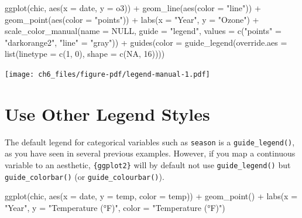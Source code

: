 \documentclass[
  letterpaper,
]{scrbook}
\newenvironment{Shaded}{\begin{snugshade}}{\end{snugshade}}
\newcommand{\AttributeTok}[1]{\textcolor[rgb]{0.40,0.45,0.13}{#1}}
\newcommand{\ConstantTok}[1]{\textcolor[rgb]{0.56,0.35,0.01}{#1}}
\newcommand{\DecValTok}[1]{\textcolor[rgb]{0.68,0.00,0.00}{#1}}
\newcommand{\FunctionTok}[1]{\textcolor[rgb]{0.28,0.35,0.67}{#1}}
\newcommand{\NormalTok}[1]{\textcolor[rgb]{0.00,0.23,0.31}{#1}}
\newcommand{\OtherTok}[1]{\textcolor[rgb]{0.00,0.23,0.31}{#1}}
\newcommand{\SpecialCharTok}[1]{\textcolor[rgb]{0.37,0.37,0.37}{#1}}
\newcommand{\StringTok}[1]{\textcolor[rgb]{0.13,0.47,0.30}{#1}}
\begin{document}
\begin{Shaded}
\begin{Highlighting}[]
\FunctionTok{ggplot}\NormalTok{(chic, }\FunctionTok{aes}\NormalTok{(}\AttributeTok{x =}\NormalTok{ date, }\AttributeTok{y =}\NormalTok{ o3)) }\SpecialCharTok{+}
  \FunctionTok{geom\_line}\NormalTok{(}\FunctionTok{aes}\NormalTok{(}\AttributeTok{color =} \StringTok{"line"}\NormalTok{)) }\SpecialCharTok{+}
  \FunctionTok{geom\_point}\NormalTok{(}\FunctionTok{aes}\NormalTok{(}\AttributeTok{color =} \StringTok{"points"}\NormalTok{)) }\SpecialCharTok{+}
  \FunctionTok{labs}\NormalTok{(}\AttributeTok{x =} \StringTok{"Year"}\NormalTok{, }\AttributeTok{y =} \StringTok{"Ozone"}\NormalTok{) }\SpecialCharTok{+}
  \FunctionTok{scale\_color\_manual}\NormalTok{(}\AttributeTok{name =} \ConstantTok{NULL}\NormalTok{,}
                     \AttributeTok{guide =} \StringTok{"legend"}\NormalTok{,}
                     \AttributeTok{values =} \FunctionTok{c}\NormalTok{(}\StringTok{"points"} \OtherTok{=} \StringTok{"darkorange2"}\NormalTok{,}
                                \StringTok{"line"} \OtherTok{=} \StringTok{"gray"}\NormalTok{)) }\SpecialCharTok{+}
  \FunctionTok{guides}\NormalTok{(}\AttributeTok{color =} \FunctionTok{guide\_legend}\NormalTok{(}\AttributeTok{override.aes =} \FunctionTok{list}\NormalTok{(}\AttributeTok{linetype =} \FunctionTok{c}\NormalTok{(}\DecValTok{1}\NormalTok{, }\DecValTok{0}\NormalTok{),}
                                                  \AttributeTok{shape =} \FunctionTok{c}\NormalTok{(}\ConstantTok{NA}\NormalTok{, }\DecValTok{16}\NormalTok{))))}
\end{Highlighting}
\end{Shaded}

\texttt{[image: ch6\_files/figure-pdf/legend-manual-1.pdf]}

\section{Use Other Legend Styles}\label{use-other-legend-styles}

The default legend for categorical variables such as \texttt{season} is
a \texttt{guide\_legend()}, as you have seen in several previous
examples. However, if you map a continuous variable to an aesthetic,
\texttt{\{ggplot2\}} will by default not use \texttt{guide\_legend()}
but \texttt{guide\_colorbar()} (or \texttt{guide\_colourbar()}).

\begin{Shaded}
\begin{Highlighting}[]
\FunctionTok{ggplot}\NormalTok{(chic,}
       \FunctionTok{aes}\NormalTok{(}\AttributeTok{x =}\NormalTok{ date, }\AttributeTok{y =}\NormalTok{ temp, }\AttributeTok{color =}\NormalTok{ temp)) }\SpecialCharTok{+}
  \FunctionTok{geom\_point}\NormalTok{() }\SpecialCharTok{+}
  \FunctionTok{labs}\NormalTok{(}\AttributeTok{x =} \StringTok{"Year"}\NormalTok{, }\AttributeTok{y =} \StringTok{"Temperature (°F)"}\NormalTok{, }\AttributeTok{color =} \StringTok{"Temperature (°F)"}\NormalTok{)}
\end{Highlighting}
\end{Shaded}
\end{document}
